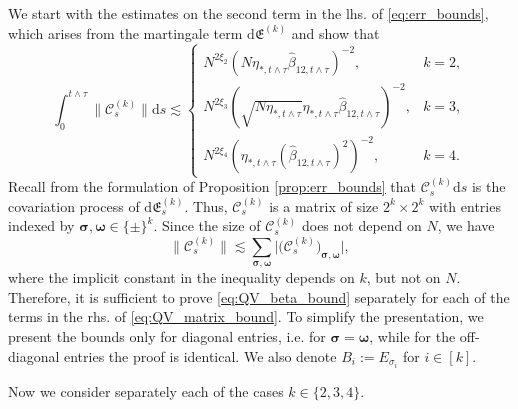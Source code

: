 \documentclass[10pt]{amsart}
\numberwithin{equation}{section}
\newcommand{\dif}{\mathrm{d}}
\begin{document}
We start with the estimates on the second term in the lhs. of \eqref{eq:err_bounds}, which arises from the martingale term $\dif\mathfrak{E}^{(k)}$ and show that
\begin{equation}
\int_0^{t\wedge\tau} \|\mathcal{C}^{(k)}_s\| \dif s \lesssim 
\begin{cases}
N^{2\xi_2}(N\eta_{*,t\wedge\tau}\widehat{\beta}_{12,t\wedge\tau})^{-2},&k=2,\\
N^{2\xi_3}(\sqrt{N\eta_{*,t\wedge\tau}}\eta_{*,t\wedge\tau}\widehat{\beta}_{12,t\wedge\tau})^{-2},&k=3,\\
N^{2\xi_4}(\eta_{*,t\wedge\tau}(\widehat{\beta}_{12,t\wedge\tau})^2)^{-2},&k=4.
\end{cases}
\label{eq:QV_beta_bound}
\end{equation}
Recall from the formulation of Proposition \ref{prop:err_bounds} that $\mathcal{C}^{(k)}_s\dif s$ is the covariation process of $\dif\mathfrak{E}^{(k)}_s$. Thus, $\mathcal{C}^{(k)}_s$ is a matrix of size $2^k\times 2^k$ with entries indexed by $\bm{\sigma},\bm{\omega}\in\{\pm\}^k$.
Since the size of $\mathcal{C}^{(k)}_s$ does not depend on $N$, we have
\begin{equation}
\|\mathcal{C}^{(k)}_s\|\lesssim \sum_{\bm{\sigma}, \bm{\omega}} \Big\vert\big(\mathcal{C}^{(k)}_s\big)_{\bm{\sigma}, \bm{\omega}}\Big\vert,
\label{eq:QV_matrix_bound}
\end{equation}
where the implicit constant in the inequality depends on $k$, but not on $N$. Therefore, it is sufficient to prove \eqref{eq:QV_beta_bound} separately for each of the terms in the rhs. of \eqref{eq:QV_matrix_bound}. To simplify the presentation, we present the bounds only for diagonal entries, i.e. for $\bm{\sigma}=\bm{\omega}$, while for the off-diagonal entries the proof is identical. We also denote $B_i:=E_{\sigma_i}$ for $i\in [k]$. 


Now we consider separately each of the cases $k\in\{2,3,4\}$.


\medskip
\end{document}
